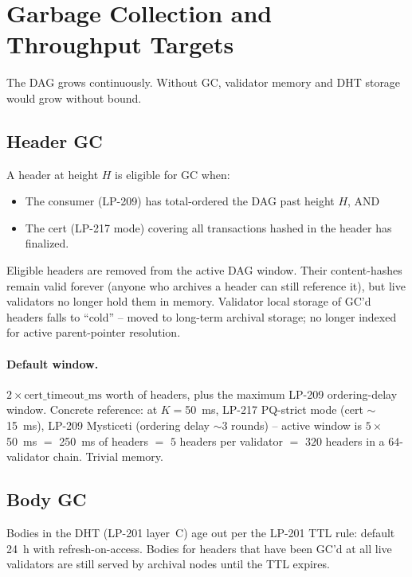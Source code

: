 \section{Garbage Collection and Throughput Targets}

The DAG grows continuously. Without GC, validator memory and DHT
storage would grow without bound.

\subsection{Header GC}

A header at height $H$ is eligible for GC when:

\begin{itemize}[leftmargin=2em,nosep]
\item The consumer (LP-209) has total-ordered the DAG past height
  $H$, AND
\item The cert (LP-217 mode) covering all transactions hashed in the
  header has finalized.
\end{itemize}

Eligible headers are removed from the active DAG window. Their
content-hashes remain valid forever (anyone who archives a header
can still reference it), but live validators no longer hold them in
memory. Validator local storage of GC'd headers falls to ``cold''
-- moved to long-term archival storage; no longer indexed for active
parent-pointer resolution.

\paragraph{Default window.} $2 \times \textrm{cert\_timeout\_ms}$
worth of headers, plus the maximum LP-209 ordering-delay window.
Concrete reference: at $K{=}$\SI{50}{\milli\second}, LP-217
PQ-strict mode (cert $\sim$\SI{15}{\milli\second}), LP-209 Mysticeti
(ordering delay $\sim 3$ rounds) -- active window is
$5 \times $\SI{50}{\milli\second} $=$ \SI{250}{\milli\second} of
headers $=$ $5$ headers per validator $=$ $320$ headers in a
$64$-validator chain. Trivial memory.

\subsection{Body GC}

Bodies in the DHT (LP-201 layer~C) age out per the LP-201 TTL rule:
default \SI{24}{\hour} with refresh-on-access. Bodies for headers
that have been GC'd at all live validators are still served by
archival nodes until the TTL expires.

